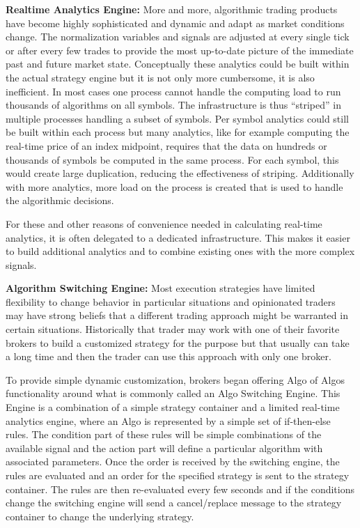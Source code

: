 \noindent\textbf{Realtime Analytics Engine:} More and more, algorithmic trading products have become highly sophisticated and dynamic and adapt as market conditions change. The normalization variables and signals are adjusted at every single tick or after every few trades to provide the most up-to-date picture of the immediate past and future market state. Conceptually these analytics could be built within the actual strategy engine but it is not only more cumbersome, it is also inefficient. In most cases one process cannot handle the computing load to run thousands of algorithms on all symbols. The infrastructure is thus ``striped'' in multiple processes handling a subset of symbols. Per symbol analytics could still be built within each process but many analytics, like for example computing the real-time price of an index midpoint, requires that the data on hundreds or thousands of symbols be computed in the same process. For each symbol, this would create large duplication, reducing the effectiveness of striping. Additionally with more analytics, more load on the process is created that is used to handle the algorithmic decisions.


For these and other reasons of convenience needed in calculating real-time analytics, it is often delegated to a dedicated infrastructure. This makes it easier to build additional analytics and to combine existing ones with the more complex signals. \twomedskip


\noindent\textbf{Algorithm Switching Engine:}\label{in:algo_swit_eng} Most execution strategies have limited flexibility to change behavior in particular situations and opinionated traders may have strong beliefs that a different trading approach might be warranted in certain situations. Historically that trader may work with one of their favorite brokers to build a customized strategy for the purpose but that usually can take a long time and then the trader can use this approach with only one broker. 


To provide simple dynamic customization, brokers began offering Algo of Algos functionality around what is commonly called an Algo Switching Engine. This Engine is a combination of a simple strategy container and a limited real-time analytics engine, where an Algo is represented by a simple set of if-then-else rules. The condition part of these rules will be simple combinations of the available signal and the action part will define a particular algorithm with associated parameters. Once the order is received by the switching engine, the rules are evaluated and an order for the specified strategy is sent to the strategy container. The rules are then re-evaluated every few seconds and if the conditions change the switching engine will send a cancel/replace message to the strategy container to change the underlying strategy. \twomedskip


